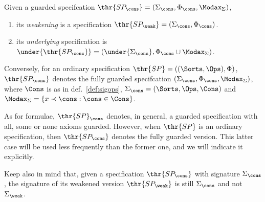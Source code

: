 \begin{definition}\label{def:specOps}
Given a guarded specifcation $\thr{SP_\cons}
= (\Sigma_\cons,\Phi_\cons,\Modax_{\Sigma})$, 
\begin{enumerate}\MyLPar
\item its {\em weakening} is a
specification $\thr{SP_\weak} = (\Sigma_\cons,\Phi_\cons)$.
\item its {\em underlying} specification is $\under{\thr{SP_\cons}} = (\under{\Sigma_\cons},
\Phi_\cons \cup \Modax_\Sigma)$.
\end{enumerate}
Conversely, for an ordinary specification $\thr{SP}=((\Sorts,\Ops),\Phi)$,
$\thr{SP_\cons}$ denotes the fully guarded specifcation
$(\Sigma_\cons,\Phi_\cons,\Modax_{\Sigma})$, where $\Cons$ is as in
def.~\ref{def:sigops}, 
$\Sigma_\cons=(\Sorts,\Ops,\Cons)$ and
$\Modax_\Sigma=\{x\prec \cons:\cons\in\Cons\}$.
\end{definition}
% 
As for formulae, $\thr{SP}_\cons$ denotes, in general, a guarded specification with all,
some or none axioms guarded. However, when $\thr{SP}$ is an ordinary specification,
then $\thr{SP_\cons}$ denotes the fully guarded version. This latter case will be
used less frequently than the former one, and we will indicate it explicitly.

Keep also in mind that, given a specification $\thr{SP_\cons}$ with signature
$\Sigma_\cons$, the signature of its weakened version $\thr{SP_\weak}$ is
still $\Sigma_\cons$ and not $\Sigma_\weak$.

